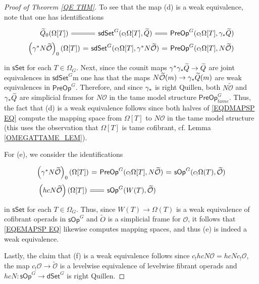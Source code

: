\documentclass[a4paper,10pt]{article}%
\numberwithin{equation}{section}
\numberwithin{figure}{section}
\theoremstyle{definition} %
\newcommand{\sSet}{\ensuremath{\mathsf{sSet}}}%
\newcommand{\sOp}{\ensuremath{\mathsf{sOp}}}%
\newcommand{\dSet}{\mathsf{dSet}}
\renewcommand{\O}{\ensuremath{\mathcal O}}
\newcommand{\1}{\ensuremath{\mathbbm 1}}%
\begin{document}
\begin{proof}[Proof of Theorem \ref{QE THM}]
To see that the map (d) is a weak equivalence,
note that one has identifications 
\begin{equation}\label{EQDMAPSP EQ}
\begin{tikzcd}[row sep=0,column sep=7pt]
	\widetilde{Q}_0(\Omega[T])
	\ar[equal]{r}
&
	\mathsf{sdSet}^G(c_!\Omega[T],\widetilde{Q})
	\ar[equal]{r}
&
	\mathsf{PreOp}^G(c_!\Omega[T],\gamma_{\**}\widetilde{Q})
\\
	\left(\gamma^{\**} N \widetilde{\mathcal{O}}\right)_0(\Omega[T])
	\ar[equal]{r}
&
	\mathsf{sdSet}^G(c_!\Omega[T],\gamma^{\**} N \widetilde{\mathcal{O}})
	\ar[equal]{r}
&
	\mathsf{PreOp}^G(c_!\Omega[T], N \widetilde{\mathcal{O}})
\end{tikzcd}
\end{equation}
in $\sSet$ for each $T \in \Omega_G$.
Next, since the counit maps 
$\gamma^{\**} \gamma_{\**} \widetilde{Q} \to \widetilde{Q}$
are joint equivalences in 
$\mathsf{sdSet}^G$m
one has that the maps
$N\widetilde{\O}(m) \to \gamma_{\**}
\widetilde{Q}(m)$
are weak equivalences in $\mathsf{PreOp}^G$.
Therefore, and since $\gamma_{\**}$ is right Quillen,
both $N\widetilde{\O}$ and $\gamma_{\**}\widetilde{Q}$
are simplicial frames for $N \O$
in the tame model structure
$\mathsf{PreOp}^G_{tame}$.
Thus, the fact that (d) is a weak equivalence
follows since both halves of \eqref{EQDMAPSP EQ}
compute the mapping space from 
$\Omega[T]$ to $N \O$
in the tame model structure
(this uses the observation that
$\Omega[T]$ is tame cofibrant, cf. Lemma \ref{OMEGATTAME_LEM}).


For (e), we consider the identifications
\begin{equation}\label{EQEMAPSP EQ}
\begin{tikzcd}[row sep=0,column sep=7pt]
	\left(\gamma^{\**} N \widetilde{\mathcal{O}}\right)_0(\Omega[T])
	\ar[equal]{r}
&
	\mathsf{PreOp}^G(c_!\Omega[T], N \widetilde{\mathcal{O}})
	\ar[equal]{r}
&
	\mathsf{sOp}^G(c_!\Omega(T), \widetilde{\mathcal{O}})
\\
	\left(hcN \widetilde{\mathcal{O}} \right)(\Omega[T])
	\ar[equal]{r} 
&
	\mathsf{sOp}^G(W(T),  \widetilde{\mathcal{O}})
\end{tikzcd}
\end{equation}
in $\mathsf{sSet}$ for each $T \in \Omega_G$.
Thus, since $W(T) \to \Omega(T)$ is a weak equivalence of cofibrant operads in $\sOp^G$
and $\widetilde{O}$ is a simplicial frame for $\O$,
it follows that 
\eqref{EQEMAPSP EQ}
likewise computes mapping spaces, 
and thus (e) is indeed a weak equivalence. 

Lastly, the claim that (f)
is a weak equivalence follows since
$c_! hcN \mathcal{O} = hcN c_! \mathcal{O}$,
the map
$c_! \mathcal{O} \to \widetilde{\O}$
is a levelwise equivalence of levelwise fibrant operads
and $hcN \colon \sOp^G \to \dSet^G$ is right Quillen.
\end{proof}
\end{document}
